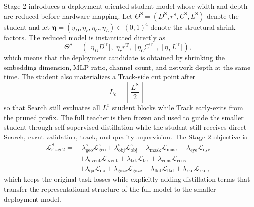 \documentclass[journal]{IEEEtran}
\begin{document}
Stage 2 introduces a deployment-oriented student model whose width and depth are reduced before hardware mapping. Let $\Theta^{\mathrm{S}}=(D^{\mathrm{S}}, r^{\mathrm{S}}, C^{\mathrm{S}}, L^{\mathrm{S}})$ denote the student and let $\bm\eta=(\eta_D,\eta_r,\eta_C,\eta_L)\in(0,1)^4$ denote the structural shrink factors. The reduced model is instantiated directly as
\begin{equation}
\Theta^{\mathrm{S}}=
(\lfloor \eta_D D^{\mathrm{T}}\rfloor,\;
\eta_r r^{\mathrm{T}},\;
\lfloor \eta_C C^{\mathrm{T}}\rfloor,\;
\lfloor \eta_L L^{\mathrm{T}}\rfloor),
\end{equation}
which means that the deployment candidate is obtained by shrinking the embedding dimension, MLP ratio, channel count, and network depth at the same time. The student also materializes a Track-side cut point after
\begin{equation}
L_c = \left\lfloor \frac{L^{\mathrm S}}{2} \right\rfloor,
\end{equation}
so that Search still evaluates all $L^{\mathrm S}$ student blocks while Track early-exits from the pruned prefix. The full teacher is then frozen and used to guide the smaller student through self-supervised distillation while the student still receives direct Search, event-validation, track, and quality supervision. The Stage-2 objective is
\begin{align}
\mathcal L_{\mathrm{stage2}}^{\mathrm{S}} =
&\;\lambda_{\mathrm{geo}}^{\mathrm{s}}\mathcal L_{\mathrm{geo}}^{\mathrm{s}}
+ \lambda_{\mathrm{obj}}^{\mathrm{s}}\mathcal L_{\mathrm{obj}}^{\mathrm{s}}
+ \lambda_{\mathrm{mask}}\mathcal L_{\mathrm{mask}}
+ \lambda_{\mathrm{eye}}\mathcal L_{\mathrm{eye}}
\nonumber\\
&+ \lambda_{\mathrm{event}}\mathcal L_{\mathrm{event}}
+ \lambda_{\mathrm{trk}}\mathcal L_{\mathrm{trk}}
+ \lambda_{\mathrm{cons}}\mathcal L_{\mathrm{cons}}
\nonumber\\
&+ \lambda_{\mathrm{qa}}\mathcal L_{\mathrm{qa}}
+ \lambda_{\mathrm{gaze}}\mathcal L_{\mathrm{gaze}}
+ \lambda_{\mathrm{fkd}}\mathcal L_{\mathrm{fkd}}
+ \lambda_{\mathrm{rkd}}\mathcal L_{\mathrm{rkd}},
\end{align}
which keeps the original task losses while explicitly adding distillation terms that transfer the representational structure of the full model to the smaller deployment model.
\end{document}
